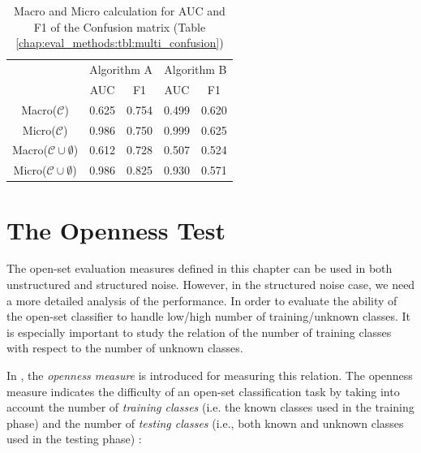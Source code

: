 \begin{table}[t]
	\center
	\caption{Macro and Micro calculation for AUC and F1 of the Confusion matrix (Table \ref{chap:eval_methods:tbl:multi_confusion})}\label{chap:eval_methods:tbl:AUC_F1}
	\begin{tabular}{c c c c c}
		\cline{2-5}
		& \multicolumn{2}{|c|}{Algorithm A} & \multicolumn{2}{c|}{Algorithm B} \\
		\cline{2-5}
		& \multicolumn{1}{|c}{AUC} & \multicolumn{1}{c|}{F1} & \multicolumn{1}{c}{AUC} & \multicolumn{1}{c|}{F1} \\
		\hline
		\multicolumn{1}{|c}{Macro($\mathcal{C}$)} & \multicolumn{1}{|c}{0.625} & \multicolumn{1}{c|}{0.754} & 0.499 & \multicolumn{1}{c|}{0.620}\\
		\multicolumn{1}{|c}{Micro($\mathcal{C}$)} & \multicolumn{1}{|c}{0.986} & \multicolumn{1}{c|}{0.750} & 0.999 & \multicolumn{1}{c|}{0.625}\\
		\hline
		\multicolumn{1}{|c}{Macro($\mathcal{C} \cup \emptyset$)} & \multicolumn{1}{|c}{0.612} & \multicolumn{1}{c|}{0.728} & 0.507 & \multicolumn{1}{c|}{0.524}\\	
		\multicolumn{1}{|c}{Micro($\mathcal{C} \cup \emptyset$)} & \multicolumn{1}{|c}{0.986} & \multicolumn{1}{c|}{0.825} & 0.930 & \multicolumn{1}{c|}{0.571}\\
		\hline
	\end{tabular}
\end{table}


\section{The Openness Test}\label{chap:eval_methods:sec:openness}

The open-set evaluation measures defined in this chapter can be used in both unstructured and structured noise. However, in the structured noise case, we need a more detailed analysis of the performance. In order to evaluate the ability of the open-set classifier to handle low/high number of training/unknown classes. It is especially important to study the relation of the number of training classes with respect to the number of unknown classes. 

In \parencite{scheirer2013toward}, the \textit{openness measure} is introduced for measuring this relation. The openness measure indicates the difficulty of an open-set classification task by taking into account the number of \textit{training classes} (i.e. the known classes used in the training phase) and the number of \textit{testing classes} (i.e., both known and unknown classes used in the testing phase) :

